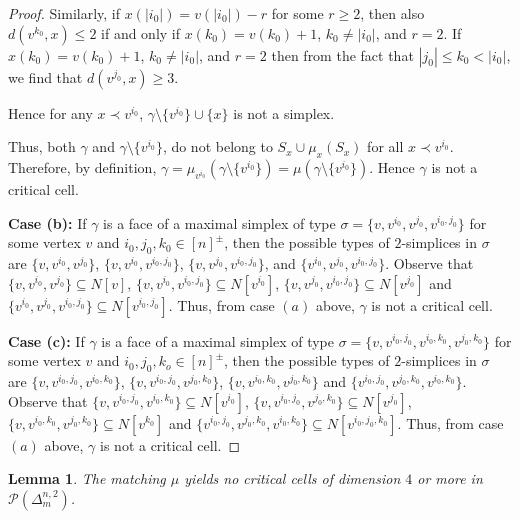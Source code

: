 \documentclass{amsart}
\newtheorem{lemma}[theorem]{Lemma}
\theoremstyle{definition}
\theoremstyle{remark}
\numberwithin{equation}{section}
\newcommand{\D}{\Delta}
\newcommand{\cP}{\mathcal{P}}
\begin{document}
\begin{proof}
    Similarly, if $x(|i_0|) = v(|i_0|) - r$ for some $r \geq 2$, then also $d(v^{k_0}, x) \leq 2$ if and only if  $x(k_0)=v(k_0)+1$, $k_0\neq |i_0|$, and $r=2$. If $x(k_0)=v(k_0)+1$, $k_0\neq |i_0|$, and $r=2$ then from the fact that $|j_0|\leq k_0<|i_0|$, we find that $d(v^{j_0},x)\geq 3$.

Hence for any $x \prec v^{i_0}$, $\gamma \setminus \{v^{i_0}\} \cup \{x\}$  is not a simplex. 
	
	
	Thus, both $\gamma $ and $\gamma\setminus \{v^{i_0}\}$, do not belong to  $S_x \cup \mu_x(S_x)$ for all $x \prec v^{i_0}$.
	Therefore, by definition, $\gamma = \mu_{v^{i_0}}(\gamma \setminus \{v^{i_0}\}) =\mu(\gamma \setminus \{v^{i_0}\}) $. Hence $\gamma$ is not a critical cell. 
	
	
	
	\smallskip
	
	\noindent\textbf{Case (b):} If $\gamma$ is a face of a maximal simplex of type $\sigma=\{v,v^{i_0},v^{j_0},v^{i_0,j_0}\}$ for some vertex $v$ and $i_0,j_0,k_0\in [n]^{\pm}$, then the possible types of $2$-simplices in $\sigma$ are $\{v,v^{i_0},v^{j_0}\}$, $\{v,v^{i_0},v^{i_0,j_0}\}$, $\{v,v^{j_0},v^{i_0,j_0}\}$, and $\{v^{i_0},v^{j_0}, v^{i_0,j_0}\}$. Observe that  $\{v,v^{i_0},v^{j_0}\} \subseteq N[v]$, $\{v,v^{i_0},v^{i_0,j_0}\} \subseteq N[v^{i_0}]$, $\{v,v^{j_0},v^{i_0,j_0}\} \subseteq N[v^{j_0}]$ and $\{v^{i_0},v^{j_0},v^{i_0,j_0}\}\subseteq N[v^{i_0,j_0}]$. 
	Thus, from case $(a)$ above, $\gamma$ is not a critical cell.
	
	
	
	\smallskip
	\noindent\textbf{Case (c):} If $\gamma$ is a face of a maximal simplex of type $\sigma=\{v,v^{i_0,j_0},v^{i_0,k_0},v^{j_0,k_0}\}$ for some vertex $v$ and $i_0,j_0,k_o\in [n]^{\pm}$, then the possible types of $2$-simplices in $\sigma$ are $\{v,v^{i_0,j_0},v^{i_0,k_0}\}$, $\{v,v^{i_0,j_0},v^{j_0,k_0}\}$, $\{v,v^{i_0,k_0},v^{j_0,k_0}\}$ and $\{v^{i_0,j_0},v^{j_0,k_0},v^{i_0,k_0}\}$. Observe that $\{v,v^{i_0,j_0},v^{i_0,k_0}\}\subseteq N[v^{i_0}]$, $\{v,v^{i_0,j_0},v^{j_0,k_0}\} \subseteq N[v^{j_0}]$, $\{v,v^{i_0,k_0},v^{j_0,k_0}\}\subseteq N[v^{k_0}]$ and $\{v^{i_0,j_0},v^{j_0,k_0},v^{i_0,k_0}\}\subseteq N[v^{i_0,j_0,k_0}]$. 
	Thus, from case $(a)$ above, $\gamma$ is not a critical cell.
\end{proof}




\begin{lemma}\label{lemma:critical_4 or more}
	The matching $\mu$ yields no critical cells of dimension $4$ or more in $\cP(\D_m^{n,2})$.
\end{lemma}
\end{document}
